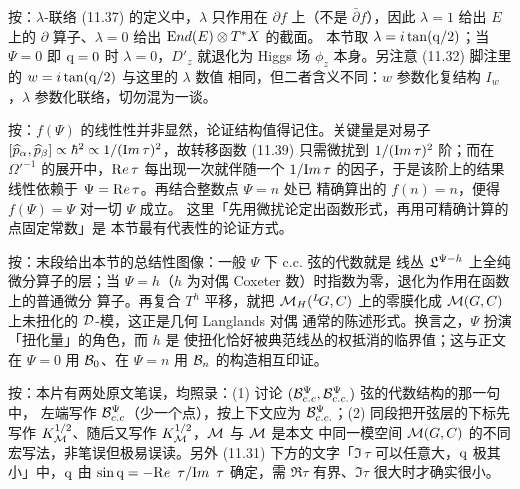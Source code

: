 \begin{yizhu}[易错点]
按：$\lambda$-联络 (11.37) 的定义中，$\lambda$ 只作用在 $\partial
f$ 上（不是 $\bar\partial f$），因此 $\lambda=1$ 给出 $E$ 上的
$\partial$ 算子、$\lambda=0$ 给出 $\End(E)\otimes T^*X$ 的截面。
本节取 $\lambda=i\tan({\eurm q}/2)$；当 $\Psi=0$ 即 ${\eurm q}=0$
时 $\lambda=0$，$D'_z$ 就退化为 Higgs 场 $\phi_z$ 本身。另注意
(11.32) 脚注里的 $w=i\tan({\eurm q}/2)$ 与这里的 $\lambda$ 数值
相同，但二者含义不同：$w$ 参数化复结构 $I_w$，$\lambda$
参数化联络，切勿混为一谈。
\end{yizhu}

\begin{yizhu}[含糊点拨]
按：$f(\Psi)$ 的线性性并非显然，论证结构值得记住。关键量是对易子
$[\hat p_\alpha,\hat p_\beta]\propto\hbar^2\propto 1/({\rm
Im}\,\tau)^2$，故转移函数 (11.39) 只需微扰到 $1/({\rm
Im}\,\tau)^2$ 阶；而在 $\Omega'^{-1}$ 的展开中，${\rm Re}\,\tau$
每出现一次就伴随一个 $1/{\rm Im}\,\tau$ 的因子，于是该阶上的结果
线性依赖于 $\Psi={\rm Re}\,\tau$。再结合整数点 $\Psi=n$ 处已
精确算出的 $f(n)=n$，便得 $f(\Psi)=\Psi$ 对一切 $\Psi$ 成立。
这里「先用微扰论定出函数形式，再用可精确计算的点固定常数」是
本节最有代表性的论证方式。
\end{yizhu}

\begin{yizhu}[物理图像]
按：末段给出本节的总结性图像：一般 $\Psi$ 下 c.c. 弦的代数就是
线丛 ${\frak L}^{\Psi-h}$ 上全纯微分算子的层；当 $\Psi=h$（$h$
为对偶 Coxeter 数）时指数为零，退化为作用在函数上的普通微分
算子。再复合 $T^h$ 平移，就把 $\MH(\LG,C)$ 上的零膜化成
$\cM(G,C)$ 上未扭化的 ${\cal D}$-模，这正是几何 Langlands 对偶
通常的陈述形式。换言之，$\Psi$ 扮演「扭化量」的角色，而 $h$ 是
使扭化恰好被典范线丛的权抵消的临界值；这与正文在 $\Psi=0$ 用
${\cal B}_0$、在 $\Psi=n$ 用 ${\cal B}_n$ 的构造相互印证。
\end{yizhu}

\begin{yizhu}[原文疑误]
按：本片有两处原文笔误，均照录：(1) 讨论 $({\cal
B}_{c.c}^\Psi,{\cal B}_{c.c.}^\Psi)$ 弦的代数结构的那一句中，
左端写作 ${\cal B}_{c.c}^\Psi$（少一个点），按上下文应为
${\cal B}_{c.c.}^\Psi$；(2) 同段把开弦层的下标先写作
$K_{\EUM}^{1/2}$、随后又写作 $K_\M^{1/2}$，$\EUM$ 与 $\M$ 是本文
中同一模空间 $\cM(G,C)$ 的不同宏写法，非笔误但极易误读。另外
(11.31) 下方的文字「${\Im\,\tau}$ 可以任意大，${\eurm q}$ 极其
小」中，${\eurm q}$ 由 $\sin{\eurm q}=-{\Re\,\tau}/{\Im\,\tau}$
确定，需 $\Re\tau$ 有界、$\Im\tau$ 很大时才确实很小。
\end{yizhu}
